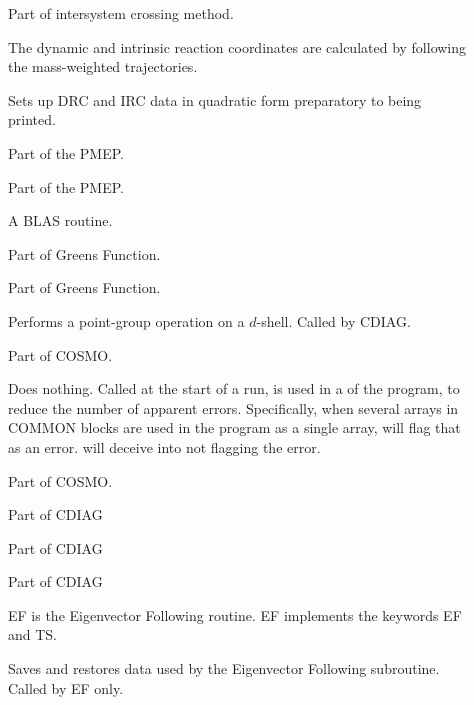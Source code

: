\begin{description}
\item[] Part of intersystem crossing method.

\item[] The dynamic and intrinsic reaction coordinates  are
calculated by following the mass-weighted trajectories.

\item[] Sets up DRC and IRC data in quadratic form  preparatory to
being printed.

\item[] Part of the PMEP.

\item[] Part of the PMEP.

\item[] A BLAS routine.

\item[] Part of Greens Function.

\item[] Part of Greens Function.

\item[] Performs a point-group operation on a $d$-shell.
  Called by CDIAG.

\item[] Part of COSMO.

\item[] Does nothing.  Called at the start of a run, 
is used in a  of the program, to reduce the number of apparent
errors.  Specifically, when several arrays in COMMON blocks are used in the
program as a single array,  will flag that as an error.
 will deceive  into not flagging the error.

\item[] Part of COSMO.

\item[] Part of CDIAG

\item[] Part of CDIAG

\item[] Part of CDIAG

\item[] EF is the Eigenvector Following routine.   EF implements
the keywords EF and TS.

\item[] Saves and restores data used by the Eigenvector Following
subroutine.  Called by EF only.


\end{description}
